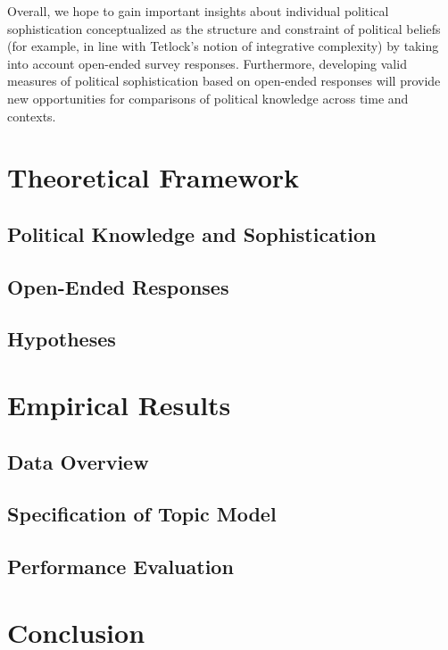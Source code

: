 \documentclass[12pt]{article}
\begin{document}
Overall, we hope to gain important insights about individual political sophistication conceptualized as the structure and constraint of political beliefs (for example, in line with Tetlock's \citeyear{tetlock1983cognitive} notion of integrative complexity) by taking into account open-ended survey responses. Furthermore, developing valid measures of political sophistication based on open-ended responses will provide new opportunities for comparisons of political knowledge across time and contexts.

\section{Theoretical Framework}

\subsection{Political Knowledge and Sophistication}

\subsection{Open-Ended Responses}

\subsection{Hypotheses}

\section{Empirical Results}

\subsection{Data Overview}

\subsection{Specification of Topic Model}

\subsection{Performance Evaluation}

\section{Conclusion}


\clearpage


\end{document}
